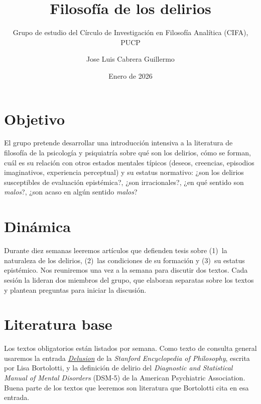\documentclass[a4paper,nofonts,justified]{tufte-handout}
\title{Filosofía de los delirios}
\subtitle{Grupo de estudio del Círculo de Investigación en Filosofía Analítica (CIFA), PUCP}
\author{Jose Luis Cabrera Guillermo}
\date{Enero de 2026}
\begin{document}
\maketitle

\begin{facts}
\end{facts}

\section{Objetivo}
El grupo pretende desarrollar una introducción intensiva a la literatura de filosofía de la psicología y psiquiatría sobre qué son los delirios, cómo se forman, cuál es su relación con otros estados mentales típicos (deseos, creencias, episodios imaginativos, experiencia perceptual) y su estatus normativo: ¿son los delirios susceptibles de evaluación epistémica?, ¿son irracionales?, ¿en qué sentido son \emph{malos}?, ¿son acaso en algún sentido \emph{malos}?

\section{Dinámica}
Durante diez semanas leeremos artículos que defienden tesis sobre (1)~la naturaleza de los delirios, (2)~las condiciones de su formación y (3)~su estatus epistémico. Nos reuniremos una vez a la semana para discutir dos textos. Cada sesión la lideran dos miembros del grupo, que elaboran separatas sobre los textos y plantean preguntas para iniciar la discusión.

\section{Literatura base}
Los textos obligatorios están listados por semana. Como texto de consulta general usaremos la entrada \href{https://plato.stanford.edu/entries/delusion/}{\emph{Delusion}} de la \emph{Stanford Encyclopedia of Philosophy}, escrita por Lisa Bortolotti, y la definición de delirio del \emph{Diagnostic and Statistical Manual of Mental Disorders} (DSM-5) de la American Psychiatric Association. Buena parte de los textos que leeremos son literatura que Bortolotti cita en esa entrada.
\end{document}
